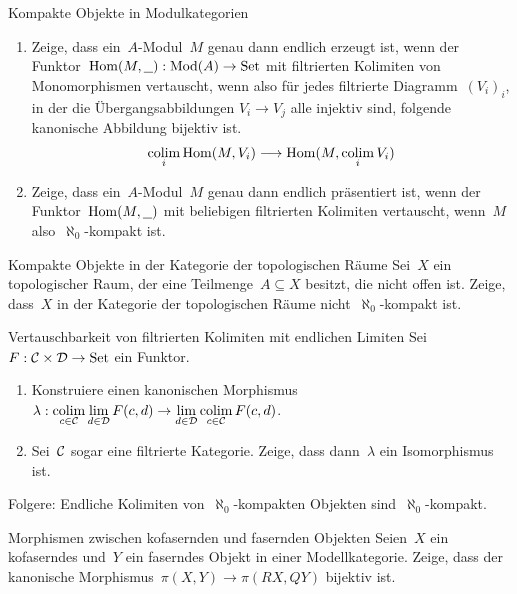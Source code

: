 \documentclass{uebblatt}
\begin{document}

\begin{aufgabe}{Kompakte Objekte in Modulkategorien}
\begin{enumerate}
\item Zeige, dass ein~$A$-Modul~$M$ genau dann endlich erzeugt ist, wenn der
Funktor~$\mathrm{Hom}(M,\underline{\ \ }) : \mathrm{Mod}(A) \to \mathrm{Set}$ mit filtrierten
Kolimiten von Monomorphismen vertauscht, wenn also für jedes filtrierte
Diagramm~$(V_i)_i$, in der die Übergangsabbildungen $V_i \to V_j$ alle injektiv
sind, folgende kanonische Abbildung bijektiv ist.
\[ \operatorname*{colim}_i \mathrm{Hom}(M,V_i) \longrightarrow \mathrm{Hom}(M, \operatorname*{colim}_i V_i) \]
\vspace{-1.7em}
\item Zeige, dass ein~$A$-Modul~$M$ genau dann endlich präsentiert ist, wenn
der Funktor~$\mathrm{Hom}(M,\underline{\ \ })$ mit beliebigen filtrierten Kolimiten
vertauscht, wenn~$M$ also~$\aleph_0$-kompakt ist.
\end{enumerate}
\end{aufgabe}

\begin{aufgabe}{Kompakte Objekte in der Kategorie der topologischen Räume}
Sei~$X$ ein topologischer Raum, der eine Teilmenge~$A \subseteq X$ besitzt, die
nicht offen ist. Zeige, dass~$X$ in der Kategorie der topologischen Räume
nicht~$\aleph_0$-kompakt ist.
\end{aufgabe}

\begin{aufgabe}{Vertauschbarkeit von filtrierten Kolimiten mit endlichen Limiten}
Sei~$F : \mathcal{C} \times \mathcal{D} \to \mathrm{Set}$ ein Funktor.
\begin{enumerate}
\item Konstruiere einen kanonischen Morphismus~$\lambda : \operatorname*{colim}\limits_{c \in \mathcal{C}}
\lim\limits_{d \in \mathcal{D}} F(c,d) \to \lim\limits_{d \in \mathcal{D}} \operatorname*{colim}\limits_{c \in \mathcal{C}} F(c,d)$.
\item Sei~$\mathcal{C}$ sogar eine filtrierte Kategorie. Zeige, dass dann~$\lambda$ ein Isomorphismus ist.
\end{enumerate}
Folgere: Endliche Kolimiten von~$\aleph_0$-kompakten Objekten
sind~$\aleph_0$-kompakt.
\end{aufgabe}

\begin{aufgabe}{Morphismen zwischen kofasernden und fasernden Objekten}
Seien~$X$ ein kofaserndes und~$Y$ ein faserndes Objekt in einer
Modellkategorie. Zeige, dass der kanonische Morphismus~$\pi(X,Y) \to
\pi(RX,QY)$ bijektiv ist.
\end{aufgabe}
\end{document}
